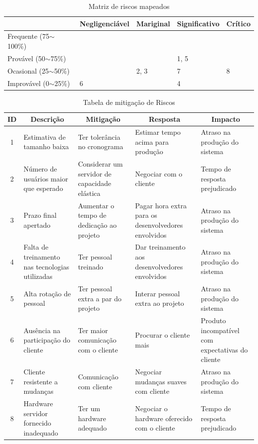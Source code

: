 \documentclass[a4paper,11pt]{article}
\begin{document}
	\begin{center}
	\begin{table}[H]
		\begin{tabularx}{\textwidth}{l|X|X|X|X|}
										& Negligenciável		& Mariginal				& Significativo			& Crítico \\ \hline
			Frequente (75$\sim$100\%) 	& \cellcolor{yellow}	& \cellcolor{red}		& \cellcolor{red}		& \cellcolor{red} \\ \hline
			Provável (50$\sim$75\%)		&						& \cellcolor{yellow}	& \cellcolor{red} 1, 5	& \cellcolor{red} \\ \hline
			Ocasional (25$\sim$50\%)	&  						& 2, 3					& \cellcolor{yellow} 7	& \cellcolor{red} 8 \\ \hline
			Improvável (0$\sim$25\%)	& 6						&						& 4						& \cellcolor{yellow} \\ \hline
		\end{tabularx}
		\caption{Matriz de riscos mapeados}
	\end{table}
	
	\end{center}
	\begin{table}[H]
		\begin{tabularx}{\textwidth}{c|X|X|X|X}
			\textbf{ID} & \multicolumn{1}{c|}{\textbf{Descrição}} & \multicolumn{1}{c|}{\textbf{Mitigação}} & \multicolumn{1}{c|}{\textbf{Resposta}} & \multicolumn{1}{c}{\textbf{Impacto}} \\
			\hline
			1 & Estimativa de tamanho baixa & Ter tolerância no cronograma & Estimar tempo acima para produção & Atraso na produção do sistema \\ \hline
			2 & Número de usuários maior que esperado & Considerar um servidor de capacidade elástica & Negociar com o cliente & Tempo de resposta prejudicado \\ \hline
			3 & Prazo final apertado & Aumentar o tempo de dedicação ao projeto & Pagar hora extra para os desenvolvedores envolvidos & Atraso na produção do sistema \\ \hline
			4 & Falta de treinamento nas tecnologias utilizadas & Ter pessoal treinado & Dar treinamento aos desenvolvedores envolvidos & Atraso na produção do sistema \\ \hline
			5 & Alta rotação de pessoal & Ter pessoal extra a par do projeto & Interar pessoal extra ao projeto & Atraso na produção do sistema \\ \hline
			6 & Ausência na participação do cliente & Ter maior comunicação com o cliente & Procurar o cliente mais & Produto incompatível com expectativas do cliente \\ \hline
			7 & Cliente resistente a mudanças & Comunicação com cliente & Negociar mudanças suaves com cliente & Atraso na produção do sistema \\ \hline
			8 & Hardware servidor fornecido inadequado & Ter um hardware adequado & Negociar o hardware oferecido com o cliente & Tempo de resposta prejudicado \\
		\end{tabularx}
		\caption{Tabela de mitigação de Riscos}
	\end{table}
\end{document}
